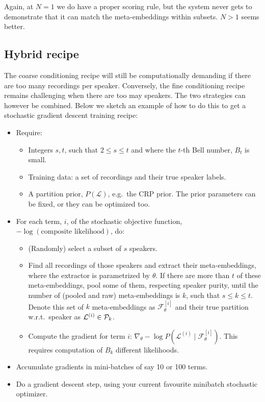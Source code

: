 \documentclass[a4paper,oneside,12pt,english]{report}
\def\Lset{\mathcal{L}}
\def\Fset{\mathcal{F}}
\begin{document}
Again, at $N=1$ we do have a proper scoring rule, but the system never gets to demonstrate that it can match the meta-embeddings within subsets. $N>1$ seems better.

\subsection{Hybrid recipe}
The coarse conditioning recipe will still be computationally demanding if there are too many recordings per speaker. Conversely, the fine conditioning recipe remains challenging when there are too may speakers. The two strategies can however be combined. Below we sketch an example of how to do this to get a stochastic gradient descent training recipe: 
\begin{itemize}
  \item Require: 
	\begin{itemize}
		\item Integers $s,t$, such that $2\le s \le t$ and where the $t$-th Bell number, $B_t$ is small.
		\item Training data: a set of recordings and their true speaker labels.
		\item A partition prior, $P(\Lset)$, e.g.\ the CRP prior. The prior parameters can be fixed, or they can be optimized too.
	\end{itemize}
	\item For each term, $i$, of the stochastic objective function, $-\log(\text{composite likelihood})$, do:
	\begin{itemize}
	   \item (Randomly) select a subset of $s$ speakers.
	   \item Find all recordings of those speakers and extract their meta-embeddings, where the extractor is parametrized by $\theta$. If there are more than $t$ of these meta-embeddings, pool some of them, respecting speaker purity, until the number of (pooled and raw) meta-embeddings is $k$, such that $s\le k \le t$. Denote this set of $k$ meta-embeddings as $\Fset^{[i]}_\theta$ and their true partition w.r.t.\ speaker as $\Lset^{(i)}\in\Pset_k$.
		\item Compute the gradient for term $i$: $\nabla_\theta -\log P(\Lset^{(i)}\mid\Fset^{[i]}_\theta)$. This requires computation of $B_k$ different likelihoods.
  \end{itemize}
  \item Accumulate gradients in mini-batches of say 10 or 100 terms.
	\item Do a gradient descent step, using your current favourite minibatch stochastic optimizer.
\end{itemize}
  
\end{document}
